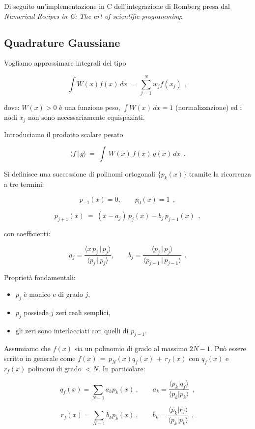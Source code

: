 \documentclass{article}
\begin{document}
	Di seguito un'implementazione in C dell'integrazione di Romberg presa dal \emph{Numerical Recipes in C: The art of scientific programming}:
	
	
	
	\subsection{Quadrature Gaussiane}
	Vogliamo approssimare integrali del tipo
	
	\[\int W(x) f(x)\, dx\ =\ \sum_{j=1}^{N} w_j f(x_j)\ \ ,\]
	
	dove: $W(x) > 0$ è una funzione peso, $\int W(x)\,dx = 1$ (normalizzazione) ed i nodi $x_j$ non sono necessariamente equispaziati.
	
	Introduciamo il prodotto scalare pesato
	
	\[\langle f\, |\, g \rangle\ =\ \int\, W(x)\, f(x)\, g(x)\, dx\ \ .\]
	
	Si definisce una successione di polinomi ortogonali $\{p_k(x)\}$ tramite la ricorrenza a tre termini:
	
	\[ p_{-1}(x)=0, \qquad p_0(x)=1\ \ ,\]
	
	\[ p_{j+1}(x)\ =\ (x-a_j)\, p_j(x) - b_j\, p_{j-1}(x)\ \ ,\]
	
	con coefficienti:
	
	\[a_j = \frac{\langle x\, p_j\, |\, p_j \rangle}{\langle p_j\, |\, p_j \rangle},
	\qquad
	b_j =\frac{\langle p_j\, |\, p_j \rangle}{\langle p_{j-1}\, |\, p_{j-1} \rangle}\ \ .
	\]
	
	Proprietà fondamentali:
	
	\begin{itemize}
		\item $p_j$ è monico e di grado $j$,
		\item $p_j$ possiede $j$ zeri reali semplici,
		\item gli zeri sono interlacciati con quelli di $p_{j-1}$.
	\end{itemize}
	
	Assumiamo che $f(x)$ sia un polinomio di grado al massimo $2N-1$. Può essere scritto in generale come $f(x)\,=\, p_N(x)q_f(x)\,+\, r_f(x)$ con $q_f(x)$ e $r_f(x)$ polinomi di grado $<N$. In particolare:
	
	\[ q_f(x)=\sum_{N-1} a_k p_k (x)\ , \qquad a_k=\frac{\langle p_k|q_f\rangle}{\langle p_k |p_k\rangle}\ \ ,\]
	
	\[ r_f(x)=\sum_{N-1} b_k p_k (x)\ , \qquad b_k=\frac{\langle p_k|r_f\rangle}{\langle p_k |p_k\rangle}\ \ ,\]
	
\end{document}
